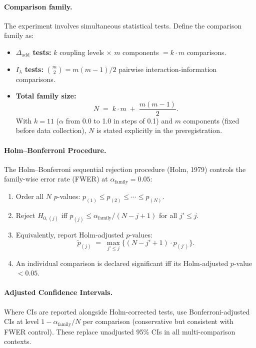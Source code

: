 \documentclass[11pt,a4paper]{article}
\theoremstyle{definition}
\theoremstyle{remark}
\newcommand{\Dadd}{\Delta_{\mathrm{add}}}
\newcommand{\Ilambda}{I_{\lambda}}
\begin{document}
\paragraph{Comparison family.}
The experiment involves simultaneous statistical tests.  Define the comparison
family as:
\begin{itemize}
  \item \textbf{$\Dadd$ tests:} $k$ coupling levels $\times$ $m$ components
    $= k \cdot m$ comparisons.
  \item \textbf{$\Ilambda$ tests:} $\binom{m}{2} = m(m-1)/2$ pairwise
    interaction-information comparisons.
  \item \textbf{Total family size:}
    \begin{equation}\label{eq:family-size}
      N \;=\; k \cdot m \;+\; \frac{m(m-1)}{2}.
    \end{equation}
    With $k = 11$ ($\alpha$ from 0.0 to 1.0 in steps of 0.1) and $m$
    components (fixed before data collection), $N$ is stated explicitly in
    the preregistration.
\end{itemize}

\paragraph{Holm--Bonferroni Procedure.}
The Holm--Bonferroni sequential rejection procedure (Holm, 1979) controls the
family-wise error rate (FWER) at $\alpha_{\mathrm{family}} = 0.05$:
\begin{enumerate}
  \item Order all $N$ $p$-values:
    $p_{(1)} \leq p_{(2)} \leq \cdots \leq p_{(N)}$.
  \item Reject $H_{0,(j)}$ iff
    $p_{(j)} \leq \alpha_{\mathrm{family}} / (N - j + 1)$ for all $j' \leq j$.
  \item Equivalently, report Holm-adjusted $p$-values:
    \begin{equation}\label{eq:holm}
      \tilde{p}_{(j)} \;=\;
        \max_{j' \leq j}\bigl\{(N - j' + 1)\cdot p_{(j')}\bigr\}.
    \end{equation}
  \item An individual comparison is declared significant iff its Holm-adjusted
    $p$-value $< 0.05$.
\end{enumerate}

\paragraph{Adjusted Confidence Intervals.}
Where CIs are reported alongside Holm-corrected tests, use Bonferroni-adjusted
CIs at level $1 - \alpha_{\mathrm{family}}/N$ per comparison (conservative but
consistent with FWER control).  These replace unadjusted 95\% CIs in all
multi-comparison contexts.
\end{document}
